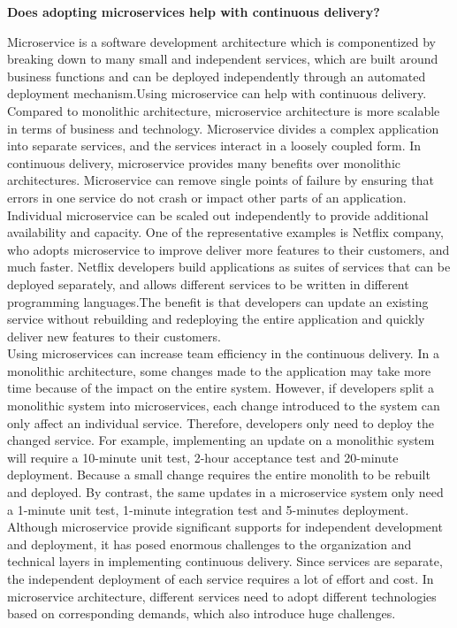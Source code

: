 \documentclass[12pt]{article}
\begin{document}
\pagestyle{empty}

{\bf Does adopting microservices help with continuous delivery?}

Microservice is a software development architecture which is componentized by breaking down to many small and independent services, which are built around business functions and can be deployed independently through an automated deployment mechanism\cite{no1}.Using microservice can help with continuous delivery. \\[10px]
Compared to monolithic architecture, microservice architecture is more scalable in terms of business and technology. Microservice divides a complex application into separate services, and the services interact in a loosely coupled form. In continuous delivery, microservice provides many benefits over monolithic architectures. Microservice can remove single points of failure by ensuring that errors in one service do not crash or impact other parts of an application\cite{no2}. Individual microservice can be scaled out independently to provide additional availability and capacity. One of the representative examples is Netflix company\cite{no3}, who adopts microservice to improve deliver more features to their customers, and much faster. Netflix developers build applications as suites of services that can be deployed separately, and allows different services to be written in different programming languages\cite{no3}.The benefit is that developers can update an existing service without rebuilding and redeploying the entire application and quickly deliver new features to their customers.\\[10px]
Using microservices can increase team efficiency in the continuous delivery. In a monolithic architecture, some changes made to the application may take more time because of the impact on the entire system\cite{no1}. However, if developers split a monolithic system into microservices, each change introduced to the system can only affect an individual service\cite{no4}. Therefore, developers only need to deploy the changed service. For example, implementing an update on a monolithic system will require a 10-minute unit test, 2-hour acceptance test and 20-minute deployment. Because a small change requires the entire monolith to be rebuilt and deployed. By contrast, the same updates in a microservice system only need a 1-minute unit test, 1-minute integration test and 5-minutes deployment\cite{no4}.\\[10px]
Although microservice provide significant supports for independent development and deployment, it has posed enormous challenges to the organization and technical layers in implementing continuous delivery\cite{no4}. Since services are separate, the independent deployment of each service requires a lot of effort and cost. In microservice architecture, different services need to adopt different technologies based on corresponding demands, which also introduce huge challenges.
\end{document}

